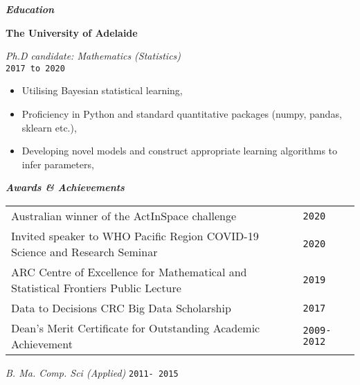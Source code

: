 \documentclass{article}
\begin{document}
\begin{multicols}{2}

\textbf{\emph{Education}}

\textbf{ The University of Adelaide} 

\emph{Ph.D candidate: Mathematics (Statistics)}\\
 \texttt{2017 to 2020}
\hypersetup{urlcolor=black}
\begin{itemize}
	\item Utilising Bayesian statistical learning,
	\item Proficiency in Python and standard quantitative packages (numpy, pandas, sklearn etc.),
	\item Developing novel models and construct appropriate learning algorithms to infer parameters,
\end{itemize}




\textbf{\emph{Awards \& Achievements}}

\centering
\begin{tabular}{ p{6.75cm} p{0.25cm} }
Australian winner of the ActInSpace challenge & \texttt{2020} \\
Invited speaker to WHO Pacific Region COVID-19 Science and Research Seminar & \texttt{2020} \\
ARC Centre of Excellence for Mathematical and Statistical Frontiers Public Lecture & \texttt{2019}\\
Data to Decisions CRC {Big Data Scholarship} &  \texttt{2017} \\
Dean's Merit Certificate for Outstanding Academic Achievement & \texttt{2009- 2012} \\


\end{tabular}
\end{multicols}


\emph{B. Ma. Comp. Sci (Applied)} \hfill  \texttt{2011- 2015}
\end{document}
